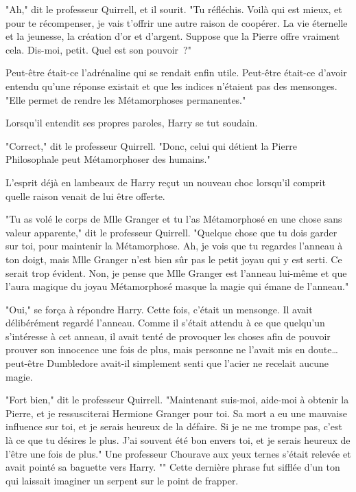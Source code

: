 "Ah," dit le professeur Quirrell, et il sourit. "Tu réfléchis. Voilà qui est mieux, et pour te récompenser, je vais t'offrir une autre raison de coopérer. La vie éternelle et la jeunesse, la création d'or et d'argent. Suppose que la Pierre offre vraiment cela. Dis-moi, petit. Quel est son pouvoir~?"

Peut-être était-ce l'adrénaline qui se rendait enfin utile. Peut-être était-ce d'avoir entendu qu'une réponse existait et que les indices n'étaient pas des mensonges. "Elle permet de rendre les Métamorphoses permanentes."

Lorsqu'il entendit ses propres paroles, Harry se tut soudain.

"Correct," dit le professeur Quirrell. "Donc, celui qui détient la Pierre Philosophale peut Métamorphoser des humains."

L'esprit déjà en lambeaux de Harry reçut un nouveau choc lorsqu'il comprit quelle raison venait de lui être offerte.

"Tu as volé le corps de Mlle Granger et tu l'as Métamorphosé en une chose sans valeur apparente," dit le professeur Quirrell. "Quelque chose que tu dois garder sur toi, pour maintenir la Métamorphose. Ah, je vois que tu regardes l'anneau à ton doigt, mais Mlle Granger n'est bien sûr pas le petit joyau qui y est serti. Ce serait trop évident. Non, je pense que Mlle Granger est l'anneau lui-même et que l'aura magique du joyau Métamorphosé masque la magie qui émane de l'anneau."

"Oui," se força à répondre Harry. Cette fois, c'était un mensonge. Il avait délibérément regardé l'anneau. Comme il s'était attendu à ce que quelqu'un s'intéresse à cet anneau, il avait tenté de provoquer les choses afin de pouvoir prouver son innocence une fois de plus, mais personne ne l'avait mis en doute… peut-être Dumbledore avait-il simplement senti que l'acier ne recelait aucune magie.

"Fort bien," dit le professeur Quirrell. "Maintenant suis-moi, aide-moi à obtenir la Pierre, et je ressusciterai Hermione Granger pour toi. Sa mort a eu une mauvaise influence sur toi, et je serais heureux de la défaire. Si je ne me trompe pas, c'est là ce que tu désires le plus. J'ai souvent été bon envers toi, et je serais heureux de l'être une fois de plus." Une professeur Chourave aux yeux ternes s'était relevée et avait pointé sa baguette vers Harry. "" Cette dernière phrase fut sifflée d'un ton qui laissait imaginer un serpent sur le point de frapper.

